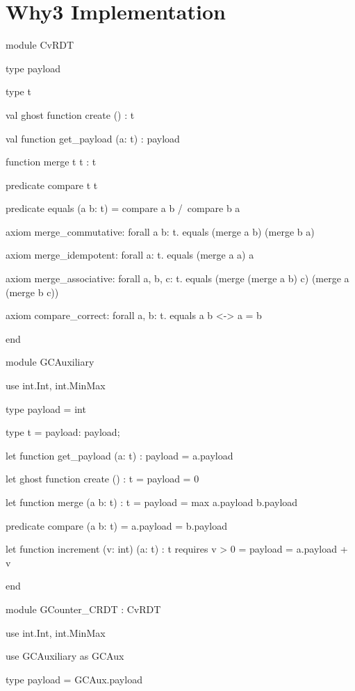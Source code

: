 %


\chapter{Why3 Implementation}
\label{app:why3_implementation}

\begin{Why3}
module CvRDT
  
  type payload
  
  type t
  
  val ghost function create () : t
  
  val function get_payload (a: t) : payload
  
  function merge t t : t
  
  predicate compare t t
  
  predicate equals (a b: t)
  = compare a b /\ compare b a
  
  axiom merge_commutative: forall a b: t.
    equals (merge a b) (merge b a)
  
  axiom merge_idempotent: forall a: t.
    equals (merge a a) a
  
  axiom merge_associative: forall a, b, c: t.
    equals (merge (merge a b) c) (merge a (merge b c))
  
  axiom compare_correct: forall a, b: t.
    equals a b <-> a = b

end

module GCAuxiliary
  
  use int.Int, int.MinMax
  
  type payload = int
  
  type t = { payload: payload; }
  
  let function get_payload (a: t) : payload
    = a.payload
  
  let ghost function create () : t
    = { payload = 0 }
  
  let function merge (a b: t) : t
    = { payload = max a.payload b.payload }
  
  predicate compare (a b: t)
    = a.payload = b.payload
  
  let function increment (v: int) (a: t) : t
    requires { v > 0 }
    = { payload = a.payload + v }

end

module GCounter_CRDT : CvRDT
  
  use int.Int, int.MinMax
  
  use GCAuxiliary as GCAux
  
  type payload = GCAux.payload
  

\end{Why3}
